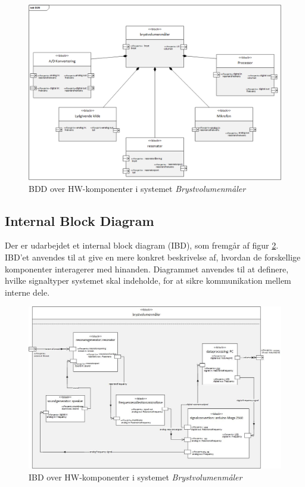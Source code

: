 \begin{figure}[htb]
\centering
\includegraphics[width=5.5in]{bdd.png}
\caption{BDD over HW-komponenter i systemet \textit{Brystvolumenmåler}}
\label{fig:bdd}	
\end{figure}

\subsection{Internal Block Diagram}
Der er udarbejdet et internal block diagram (IBD), som fremgår af figur \ref{fig:ibd}. IBD'et anvendes til at give en mere konkret beskrivelse af, hvordan de forskellige komponenter interagerer med hinanden. Diagrammet anvendes til at definere, hvilke signaltyper systemet skal indeholde, for at sikre kommunikation mellem interne dele. 

\begin{figure}[htb]
\centering
\includegraphics[width=6in]{ibd.jpg}
\caption{IBD over HW-komponenter i systemet \textit{Brystvolumenmåler}}
\label{fig:ibd}
\end{figure}

